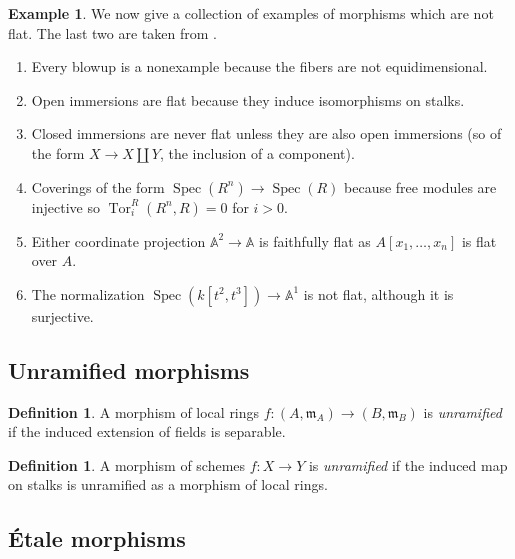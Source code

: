 \documentclass{amsart}
\DeclareMathOperator{\Spec}{Spec}
\DeclareMathOperator{\Tor}{Tor}
\theoremstyle{definition}
\newtheorem{definition}[theorem]{Definition}
\newtheorem{example}[theorem]{Example}
\theoremstyle{remark}
\begin{document}
\begin{example}
    We now give a collection of examples of morphisms which are not flat. The
    last two are taken from \cite{MorphismNotes}.
    \begin{enumerate}
        \item Every blowup is a nonexample because the fibers are not
            equidimensional.

        \item Open immersions are flat because they induce isomorphisms on
            stalks.

        \item Closed immersions are never flat unless they are also open
            immersions (so of the form $X \to X \amalg Y$, the inclusion of a
            component).

        \item Coverings of the form $\Spec(R^n) \to \Spec(R)$ because free
            modules are injective so $\Tor^R_i(R^n, R) = 0$ for $i > 0$.

        \item Either coordinate projection $\mathbb{A}^2 \to \mathbb{A}$ is
            faithfully flat as $A[x_1, \dots, x_n]$ is flat over $A$.

        \item The normalization $\Spec(k[t^2, t^3]) \to \mathbb{A}^1$ is not
            flat, although it is surjective.
    \end{enumerate}
\end{example}

\subsection{Unramified morphisms}

\begin{definition}
    A morphism of local rings $f : (A, \mathfrak{m}_A) \to (B, \mathfrak{m}_B)$
    is \textit{unramified} if the induced extension of fields is separable.
\end{definition}

\begin{definition}
    A morphism of schemes $f : X \to Y$ is \textit{unramified} if the induced
    map on stalks is unramified as a morphism of local rings.
\end{definition}



\subsection{\'Etale morphisms}
\end{document}
